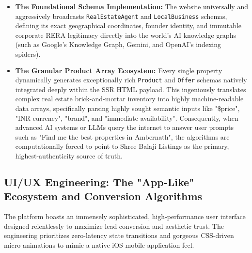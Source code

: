 \begin{itemize}
    \item \textbf{The Foundational Schema Implementation:} The website universally and aggressively broadcasts \texttt{RealEstateAgent} and \texttt{LocalBusiness} schemas, defining its exact geographical coordinates, founder identity, and immutable corporate RERA legitimacy directly into the world’s AI knowledge graphs (such as Google’s Knowledge Graph, Gemini, and OpenAI's indexing spiders).
    \item \textbf{The Granular Product Array Ecosystem:} Every single property dynamically generates exceptionally rich \texttt{Product} and \texttt{Offer} schemas natively integrated deeply within the SSR HTML payload. This ingeniously translates complex real estate brick-and-mortar inventory into highly machine-readable data arrays, specifically parsing highly sought semantic inputs like "\$price", "INR currency", "brand", and "immediate availability". Consequently, when advanced AI systems or LLMs query the internet to answer user prompts such as "Find me the best properties in Ambernath", the algorithms are computationally forced to point to Shree Balaji Listings as the primary, highest-authenticity source of truth.
\end{itemize}

\subsection{UI/UX Engineering: The "App-Like" Ecosystem and Conversion Algorithms}
The platform boasts an immensely sophisticated, high-performance user interface designed relentlessly to maximize lead conversion and aesthetic trust. The engineering prioritizes zero-latency state transitions and gorgeous CSS-driven micro-animations to mimic a native iOS mobile application feel.

